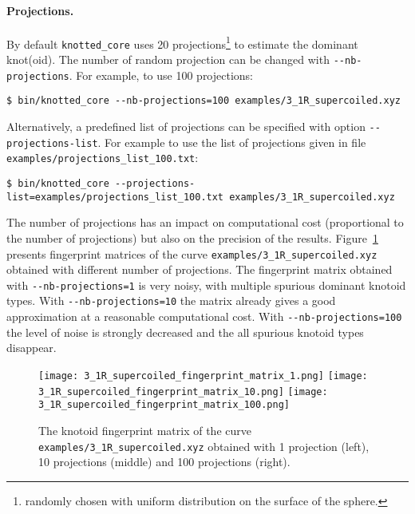 \paragraph{Projections.}
By default \lstinline{knotted_core} uses 20 projections\footnote{randomly chosen with uniform distribution on the surface of the sphere.} to estimate the dominant knot(oid). The number of random projection can be changed with \lstinline{--nb-projections}. For example, to use 100 projections:
\begin{lstlisting}
$ bin/knotted_core --nb-projections=100 examples/3_1R_supercoiled.xyz
\end{lstlisting}
Alternatively, a predefined list of projections can be specified with option \lstinline{--projections-list}. For example to use the list of projections given in file \lstinline{examples/projections_list_100.txt}:
\begin{lstlisting}
$ bin/knotted_core --projections-list=examples/projections_list_100.txt examples/3_1R_supercoiled.xyz
\end{lstlisting}

The number of projections has an impact on computational cost (proportional to the number of projections) but also on the precision of the results. 
Figure~\ref{fig:3_1R_supercoiled:fingerprint:nprojections} presents fingerprint matrices of the curve \lstinline{examples/3_1R_supercoiled.xyz} obtained with different number of projections. The fingerprint matrix obtained with \lstinline{--nb-projections=1} is very noisy, with multiple spurious dominant knotoid types. With \lstinline{--nb-projections=10} the matrix already gives a good approximation at a reasonable computational cost. With \lstinline{--nb-projections=100} the level of noise is strongly decreased and the all spurious knotoid types disappear.
\begin{figure}[t]
\centering
\texttt{[image: 3\_1R\_supercoiled\_fingerprint\_matrix\_1.png]}
\texttt{[image: 3\_1R\_supercoiled\_fingerprint\_matrix\_10.png]}
\texttt{[image: 3\_1R\_supercoiled\_fingerprint\_matrix\_100.png]}
\caption{ The knotoid fingerprint matrix of the curve \lstinline{examples/3_1R_supercoiled.xyz} obtained with 1 projection (left), 10 projections (middle) and 100 projections (right).}\label{fig:3_1R_supercoiled:fingerprint:nprojections}
\end{figure}



